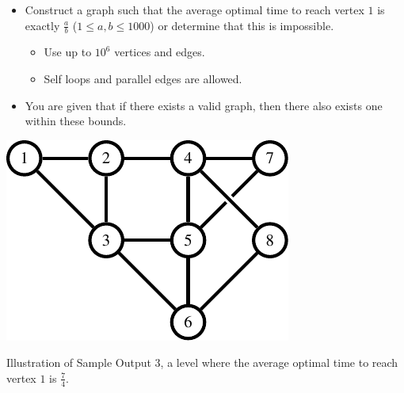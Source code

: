 \begin{frame}
    \frametitle{\problemtitle}

    \begin{itemize}
        \item Construct a graph such that the average optimal time to reach vertex $1$ is exactly $\displaystyle\frac{a}{b}$ ($1 \leq a,b \leq 1000$)
        or determine that this is impossible.
        \begin{itemize}
            \item Use up to $10^6$ vertices and edges.
            \item Self loops and parallel edges are allowed.
        \end{itemize}
        \item You are given that if there exists a valid graph, then there also
            exists one within these bounds.
    \end{itemize}

    \vspace{1em}

    \centering
    \includegraphics[height=0.3\textheight]{sample}

    \small
    Illustration of Sample Output 3, a level where the average optimal time to reach vertex $1$ is $\frac{7}{4}$.
\end{frame}
